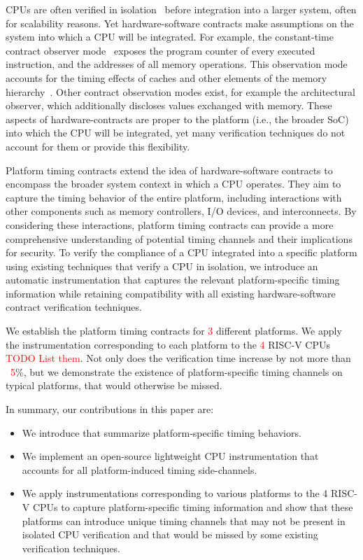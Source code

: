 CPUs are often verified in isolation~\cite{dinesh2024conjunct,dinesh2025h,ceesay2024mucfi,wang2023specification,tan2025contractshadowlogic,hsiao2024rtl2mmupath} before integration into a larger system, often for scalability reasons.
Yet hardware-software contracts make assumptions on the system into which a CPU will be integrated.
For example, the constant-time contract observer mode~\cite{guarnieri2021hardware} exposes the program counter of every executed instruction, and the addresses of all memory operations.
This observation mode accounts for the timing effects of caches and other elements of the memory hierarchy~\cite{guarnieri2021hardware,oleksenko2022revizor}.
Other contract observation modes exist, for example the architectural observer, which additionally discloses values exchanged with memory.
These aspects of hardware-contracts are proper to the platform (i.e., the broader SoC) into which the CPU will be integrated, yet many verification techniques do not account for them or provide this flexibility.

Platform timing contracts extend the idea of hardware-software contracts to encompass the broader system context in which a CPU operates.
They aim to capture the timing behavior of the entire platform, including interactions with other components such as memory controllers, I/O devices, and interconnects.
By considering these interactions, platform timing contracts can provide a more comprehensive understanding of potential timing channels and their implications for security.
To verify the compliance of a CPU integrated into a specific platform using existing techniques that verify a CPU in isolation, we introduce an automatic instrumentation that captures the relevant platform-specific timing information while retaining compatibility with all existing hardware-software contract verification techniques.

We establish the platform timing contracts for \textcolor{red}{3} different platforms.
We apply the instrumentation corresponding to each platform to the \textcolor{red}{4} RISC-V CPUs \textcolor{red}{TODO List them}.
Not only does the verification time increase by not more than ~\textcolor{red}{5}\%, but we demonstrate the existence of platform-specific timing channels on typical platforms, that would otherwise be missed.

In summary, our contributions in this paper are:
\begin{itemize}
    \item We introduce \pics that summarize platform-specific timing behaviors.
    \item We implement an open-source lightweight CPU instrumentation that accounts for all platform-induced timing side-channels.
    \item We apply instrumentations corresponding to various platforms to the 4 RISC-V CPUs to capture platform-specific timing information and show that these platforms can introduce unique timing channels that may not be present in isolated CPU verification and that would be missed by some existing verification techniques.
\end{itemize}

